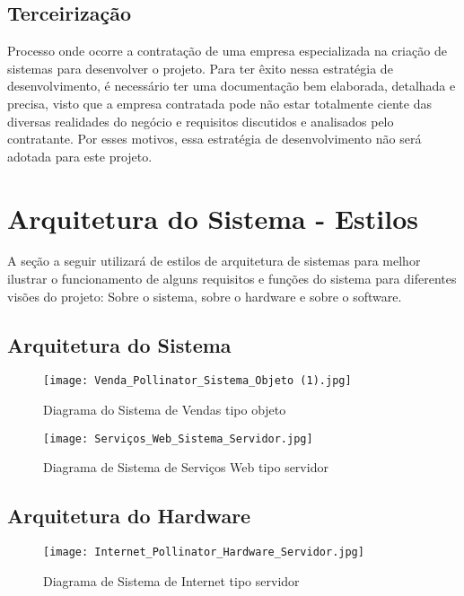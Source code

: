 		\subsection{Terceirização}
			Processo onde ocorre a contratação de uma empresa especializada na criação de sistemas para desenvolver o projeto. 
			Para ter êxito nessa estratégia de desenvolvimento, é necessário ter uma documentação bem elaborada, detalhada e precisa, visto que a empresa contratada pode não estar totalmente ciente das diversas realidades do negócio e requisitos discutidos e analisados pelo contratante. Por esses motivos, essa estratégia de desenvolvimento não será adotada para este projeto.


\section{Arquitetura do Sistema - Estilos}
	A seção a seguir utilizará de estilos de arquitetura de sistemas para melhor ilustrar o funcionamento de alguns requisitos e funções do sistema para diferentes visões do projeto: Sobre o sistema, sobre o hardware e sobre o software. 
	

    \subsection{Arquitetura do Sistema}

	\begin{figure}[H]
    \begin{center}
        \texttt{[image: Venda\_Pollinator\_Sistema\_Objeto (1).jpg]}
        \caption{Diagrama do Sistema de Vendas tipo objeto} \label{sistema}
    \end{center}
   \end{figure} 
   
   \begin{figure}[H]
    \begin{center}
        \texttt{[image: Serviços\_Web\_Sistema\_Servidor.jpg]}
        \caption{Diagrama de Sistema de Serviços Web tipo servidor} \label{sistema}
    \end{center}
   \end{figure} 

    \subsection{Arquitetura do Hardware}

	\begin{figure}[H]
    \begin{center}
        \texttt{[image: Internet\_Pollinator\_Hardware\_Servidor.jpg]}
        \caption{Diagrama de Sistema de Internet tipo servidor} \label{sistema}
    \end{center}
   \end{figure} 

